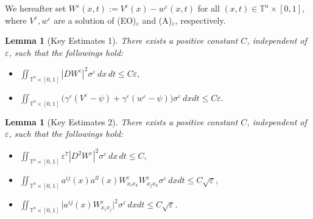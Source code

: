 \documentclass[12pt,reqno]{amsart}
\theoremstyle{plain}
\newtheorem{lem}[thm]{Lemma}
\theoremstyle{remark}
\numberwithin{equation}{section}
\begin{document}
We hereafter set $W^{\varepsilon}(x,t):=V^{\varepsilon}(x)-w^{\varepsilon}(x,t)$ for all $(x,t)\in{\mathbb{T}}^n\times[0,1]$, 
where $V^{\varepsilon},w^{\varepsilon}$ are a solution of (EO)$_{\varepsilon}$ and (A)$_{\varepsilon}$, respectively.   

\begin{lem}[Key Estimates 1] \label{lem:key1}
There exists a positive constant $C$, independent of ${\varepsilon}$, such that
the followings hold{\rm:}
\begin{itemize}
\item[(i)]
$\displaystyle
\iint_{{\mathbb{T}}^n\times[0,1]} 
|DW^{\varepsilon}|^2{\sigma}^{\varepsilon}\,dx\,dt
\le C{\varepsilon},$
\item[(ii)]
$\displaystyle
\iint_{{\mathbb{T}}^n\times[0,1]}
\big({\gamma}^{\varepsilon}(V^{\varepsilon}-\psi)+{\gamma}^{\varepsilon}(w^{\varepsilon}-\psi)\big){\sigma}^{\varepsilon}\,dxdt
\le C{\varepsilon}.$ 
\end{itemize}
\end{lem}

\begin{lem}[Key Estimates 2] \label{lem:key2}
There exists a positive constant $C$, independent of ${\varepsilon}$, such that
the followings hold{\rm:}
\begin{itemize}
\item[(i)]
$\displaystyle
\iint_{{\mathbb{T}}^n\times[0,1]} 
{\varepsilon}^7|D^2W^{\varepsilon}|^2 {\sigma}^{\varepsilon}\,dx\,dt
\le C,$
\item[(ii)]
$\displaystyle
\iint_{{\mathbb{T}}^n\times[0,1]}
a^{ij}(x) a^{ll}(x) W^{\varepsilon}_{x_i x_k}  W^{\varepsilon}_{x_j x_k}
{\sigma}^{\varepsilon}\,dxdt\le C\sqrt{\varepsilon},$  
\item[(iii)]
$\displaystyle
\iint_{{\mathbb{T}}^n\times[0,1]}
\big|a^{ij}(x)W^{\varepsilon}_{x_i x_j}\big|^2{\sigma}^{\varepsilon}\,dxdt\le C\sqrt{\varepsilon}$.  
\end{itemize}
\end{lem}
\end{document}
